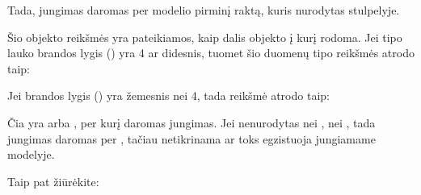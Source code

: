 \documentclass[letterpaper,10pt,lithuanian]{sphinxmanual}
\begin{document}
\begin{fulllineitems}
\sphinxAtStartPar
Tada, jungimas daromas per  modelio pirminį raktą, kuris nurodytas
{\hyperref[\detokenize{dimensijos:model.ref}]{}} stulpelyje.

\sphinxAtStartPar
Šio objekto reikšmės yra pateikiamos, kaip dalis objekto į kurį rodoma. Jei
 tipo lauko brandos lygis ({\hyperref[\detokenize{dimensijos:property.level}]{}}) yra 4 ar didesnis,
tuomet šio duomenų tipo reikšmės atrodo taip:

\begin{sphinxVerbatim}[commandchars=\\\{\}]
\end{sphinxVerbatim}

\sphinxAtStartPar
Jei brandos lygis ({\hyperref[\detokenize{dimensijos:property.level}]{}}) yra žemesnis nei 4, tada reikšmė
atrodo taip:

\begin{sphinxVerbatim}[commandchars=\\\{\}]
\end{sphinxVerbatim}

\sphinxAtStartPar
Čia  yra {\hyperref[\detokenize{dimensijos:model.ref}]{}} arba {\hyperref[\detokenize{identifikatoriai:ref-fkey}]{}}, per
kurį daromas jungimas. Jei nenurodytas nei {\hyperref[\detokenize{dimensijos:model.ref}]{}}, nei
{\hyperref[\detokenize{identifikatoriai:ref-fkey}]{}}, tada jungimas daromas per , tačiau
netikrinama ar toks  egzistuoja jungiamame modelyje.


\begin{sphinxseealso}{Taip pat žiūrėkite:}

\sphinxAtStartPar
{\hyperref[\detokenize{identifikatoriai:rysiai}]{}}


\end{sphinxseealso}


\end{fulllineitems}
\end{document}
